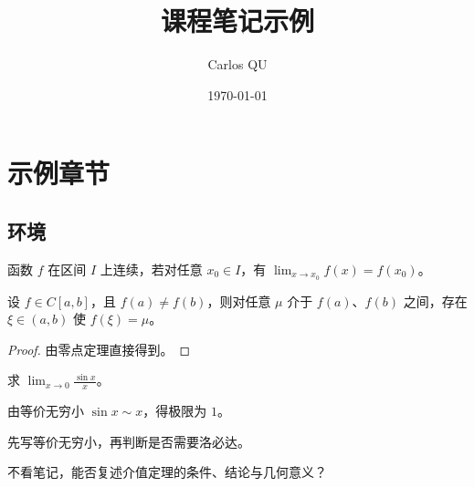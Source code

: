 \documentclass[circuit,theme=classic]{CarlosTexNote}
\title{课程笔记示例}
\author{Carlos QU}
\date{\today}
\begin{document}
\maketitle
\tableofcontents

\chapter{示例章节}

\section{环境}

\begin{definition}
函数 $f$ 在区间 $I$ 上连续，若对任意 $x_0\in I$，有 $\lim_{x\to x_0}f(x)=f(x_0)$。
\end{definition}

\begin{theorem}[介值定理]
设 $f\in C[a,b]$，且 $f(a)\ne f(b)$，则对任意 $\mu$ 介于 $f(a)$、$f(b)$ 之间，存在 $\xi\in(a,b)$ 使 $f(\xi)=\mu$。
\end{theorem}

\begin{proof}
由零点定理直接得到。
\end{proof}

\begin{example}[2024 数一]
求 $\lim_{x\to 0}\frac{\sin x}{x}$。
\end{example}

\begin{solution}
由等价无穷小 $\sin x\sim x$，得极限为 $1$。
\end{solution}

\begin{keybox}
先写等价无穷小，再判断是否需要洛必达。
\end{keybox}

\begin{recallbox}[闭卷提取]
不看笔记，能否复述介值定理的条件、结论与几何意义？
\end{recallbox}
\end{document}
